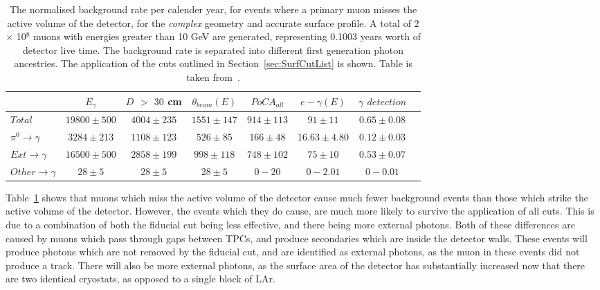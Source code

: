 \begin{table}
  \caption[The normalised background rate per calender year, for events where a primary muon misses the active volume of the detector, for the \emph{complex} geometry and accurate surface profile]
          {The normalised background rate per calender year, for events where a primary muon misses the active volume of the detector, for the \emph{complex} geometry and accurate surface profile. A total of 2 $\times$ 10$^8$ muons with energies greater than 10 GeV are generated, representing 0.1003 years worth of detector live time. The background rate is separated into different first generation photon ancestries. The application of the cuts outlined in Section~\ref{sec:SurfCutList} is shown. Table is taken from~\citep{MartinsThesis}.}
  \label{tab:SurfMuMissComp}
  \centering
  \scriptsize
  \begin{tabular}{l c c c c c c c }
    \toprule
        & $E_\gamma$ &  $D$ $>$ $30$ cm & $\theta_{beam}(E)$ & $PoCA_{all}$ & $e-\gamma(E)$ & $\gamma$ $detection$ \\
        \midrule
        $Total$          & $19800\pm500$ & $4004\pm235$ & $1551\pm147$ & $914\pm113$ & $91\pm11$      & $0.65\pm0.08$ \\

        $\pi^0\to\gamma$ & $3284\pm213$  & $1108\pm123$ & $526\pm85$   & $166\pm48$  & $16.63\pm4.80$ & $0.12\pm0.03$ \\

        $Ext\to\gamma$   & $16500\pm500$ & $2858\pm199$ & $998\pm118$  & $748\pm102$ & $75\pm10$      & $0.53\pm0.07$ \\

        $Other\to\gamma$ & $28\pm5$      & $28\pm5$     & $28\pm5$     & $0-20$      & $0-2.01$       & $0-0.01$ \\
        \bottomrule
  \end{tabular}
\end{table}

Table~\ref{tab:SurfMuMissComp} shows that muons which miss the active volume of the detector cause much fewer background events than those which strike the active volume of the detector. However, the events which they do cause, are much more likely to survive the application of all cuts. This is due to a combination of both the fiducial cut being less effective, and there being more external photons. Both of these differences are caused by muons which pass through gaps between TPCs, and produce secondaries which are inside the detector walls. These events will produce photons which are not removed by the fiducial cut, and are identified as external photons, as the muon in these events did not produce a track. There will also be more external photons, as the surface area of the detector has substantially increased now that there are two identical cryostats, as opposed to a single block of LAr. \\

